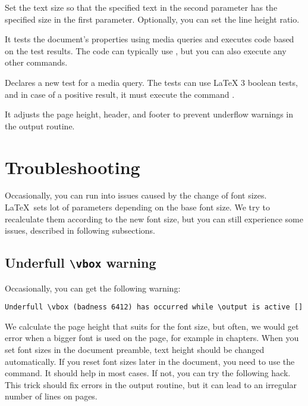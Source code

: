 \documentclass{ltxdoc}
\newcommand\StartDescribe[1]{%
  \par\medskip\noindent\DescribeMacro#1
}
\begin{document}
\StartDescribe\fonttobox
\cmd\fonttobox{}

\noindent Set the text size so that the specified text in the second parameter has
the specified size in the first parameter. Optionally, you can set the line
height ratio.

\StartDescribe\mediaquery
\cmd\mediaquery{}

\noindent
It tests the document's properties using media queries and executes code based on the test results.
The code can typically use \cmd\ResponsiveSetup, but you can also execute any other commands.

\StartDescribe\DeclareMediaQueryMatcher
\cmd\DeclareMediaQueryMatcher{}

\noindent Declares a new test for a media query. The tests can use LaTeX 3 boolean tests,
and in case of a positive result, it must execute the command 
\cmd\mediaquerytrue.

\StartDescribe\fixtextheight
\cmd\fixtextheight

\noindent It adjusts the page height, header, and footer to prevent underflow
\cmd{\vbox} warnings in the output routine.



\section{Troubleshooting}

Occasionally, you can run into issues caused by the change of font sizes. \LaTeX\ sets lot of parameters 
depending on the base font size. We try to recalculate them according to the new font size, but you can still
experience some issues, described in following subsections.

\subsection{Underfull \texttt{\textbackslash vbox} warning}

Occasionally, you can get the following warning:

\begin{verbatim}
Underfull \vbox (badness 6412) has occurred while \output is active []
\end{verbatim}

We calculate the page height that suits  for the font size, but often,
we would get error when a bigger font is used on the page,
for example in chapters. When you set font sizes in the document preamble,
text height should be changed automatically. If you reset font sizes later in the
document, you need to use the \cmd{\fixtextheight} command. It should help in
most cases. If not, you can try the following hack.
This trick should fix \cmd{\vbox} errors in the output routine, but it can lead 
to an irregular number of lines on pages.
\end{document}
